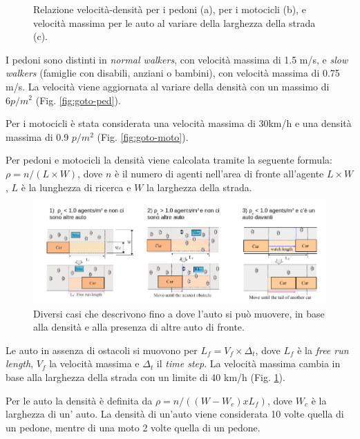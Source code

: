\begin{figure}[ht]
\begin{subfigure}{0.32\textwidth}
        \caption{}
        \label{fig:goto-auto}
    \end{subfigure}
    \caption{Relazione velocità-densità per i pedoni (a), per i motocicli (b), e velocità massima per le auto al variare della larghezza della strada (c).}
    \label{fig:ankdasndk}
\end{figure}

I pedoni sono distinti in \textit{normal walkers}, con velocità massima di 1.5 m/s, e
\textit{slow walkers} (famiglie con disabili, anziani o bambini), con velocità massima di 0.75 m/s.
%
La velocità viene aggiornata al variare della densità con un massimo di $6 p/m^2$ (Fig. \ref{fig:goto-ped}).

Per i motocicli è stata considerata una velocità massima di 30km/h e una densità massima di 0.9 $p/m^2$ (Fig. \ref{fig:goto-moto}).

Per pedoni e motocicli la densità viene calcolata tramite la seguente formula:
$\rho = n /(L \times W)$, dove $n$ è il numero di agenti nell'area di fronte all'agente $L \times W$, $L$ è la lunghezza di ricerca 
e $W$ la larghezza della strada.

\begin{figure}[ht]
    \centering
    \includegraphics[width=\textwidth]{images/goto_car.png}
    \caption{Diversi casi che descrivono fino a dove l'auto si può muovere, in base alla densità e alla presenza di altre auto di fronte.}
    \label{fig:goto-car-model}
\end{figure}

Le auto in assenza di ostacoli si muovono per $L_{f} = V_{f} \times \Delta_{t} $, dove $L_{f}$ è la \textit{free run length},
$V_{f}$ la velocità massima e $\Delta_{t}$ il \textit{time step}.
La velocità massima cambia in base alla larghezza della strada con un limite di 40 km/h (Fig. \ref{fig:goto-auto}).

Per le auto la densità è definita da $\rho = n /((W - W_{c}) x L_{f})$, dove $W_{c}$ è la larghezza di un' auto.
La densità di un'auto viene considerata 10 volte quella di un pedone, mentre di una moto 2 volte quella di un pedone.

